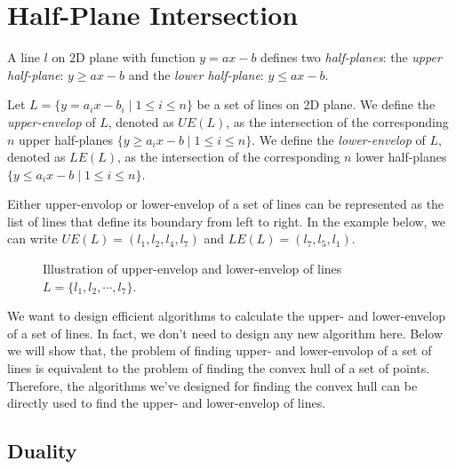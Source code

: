 \setcounter{definition}{0} \setcounter{property}{0} \setcounter{claim}{0} \setcounter{fact}{0} \setcounter{corollary}{0} \setcounter{figure}{0}
\section{Half-Plane Intersection}

\begin{definition}
A line $l$ on 2D plane with function $y = ax - b$ defines two \emph{half-planes}:
the \emph{upper half-plane}: $y \ge ax -b$ and the \emph{lower half-plane}: $y \le ax -b$.
\end{definition}

\begin{definition}
Let $L = \{y = a_i x - b_i \mid 1 \le i \le n \}$ be a set of lines on 2D plane.
We define the \emph{upper-envelop} of $L$, denoted as $UE(L)$, as the intersection of
the corresponding $n$ upper half-planes $\{y \ge a_i x -b \mid 1 \le i \le n \}$.
We define the \emph{lower-envelop} of $L$, denoted as $LE(L)$, as the intersection of
the corresponding $n$ lower half-planes $\{y \le a_i x -b \mid 1 \le i \le n \}$.
\end{definition}

Either upper-envolop or lower-envelop of a set of lines can be represented
as the list of lines that define its boundary from left to right. In the example
below, we can write $UE(L) = (l_1, l_2, l_4, l_7)$
and $LE(L) = (l_7, l_5, l_1)$.

\begin{figure}[h!]
\centering{}
\caption{Illustration of upper-envelop and lower-envelop of lines $L = \{l_1, l_2, \cdots, l_7\}$.}
\end{figure}

We want to design efficient algorithms to calculate the upper- and lower-envelop of a set of lines.
In fact, we don't need to design any new algorithm here. Below we will show that, the problem of finding
upper- and lower-envolop of a set of lines is equivalent to the problem of finding the convex hull
of a set of points. Therefore, the algorithms we've designed for finding the convex hull can be
directly used to find the upper- and lower-envelop of lines.


\subsection*{Duality}

